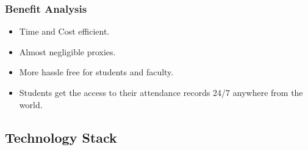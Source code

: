 \documentclass[a4paper,12pt]{article}
\begin{document}
\subsubsection{Benefit Analysis}
\begin{itemize}
    \item Time and Cost efficient.
    \item Almost negligible proxies.
    \item More hassle free for students and faculty.
    \item Students get the access to their attendance records 24/7 anywhere from the world.
\end{itemize}

\subsection{Technology Stack}
\end{document}
